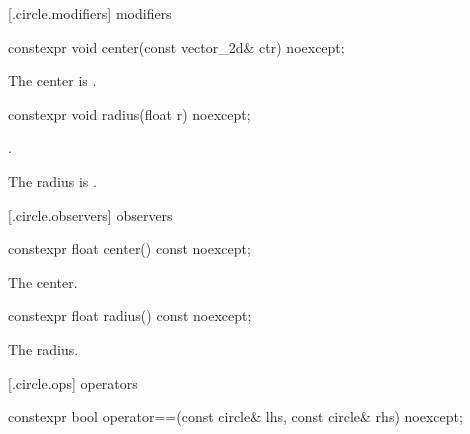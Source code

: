  [\iotwod.circle.modifiers]{ modifiers}

%
\begin{itemdecl}
constexpr void center(const vector_2d& ctr) noexcept;
\end{itemdecl}

\begin{itemdescr}
\pnum
\effects
The center is .
\end{itemdescr}

%
\begin{itemdecl}
constexpr void radius(float r) noexcept;
\end{itemdecl}
\begin{itemdescr}
\requires
{}.

\pnum
\effects
The radius is .
\end{itemdescr}

 [\iotwod.circle.observers]{ observers}

%
\begin{itemdecl}
constexpr float center() const noexcept;
\end{itemdecl}
\begin{itemdescr}
\pnum
\returns
The center.
\end{itemdescr}

%
\begin{itemdecl}
constexpr float radius() const noexcept;
\end{itemdecl}
\begin{itemdescr}
\pnum
\returns
The radius.
\end{itemdescr}

 [\iotwod.circle.ops] { operators}

%
\begin{itemdecl}
constexpr bool operator==(const circle& lhs, const circle& rhs) noexcept;
\end{itemdecl}
\begin{itemdescr}
\pnum
\returns
{}
\end{itemdescr}
